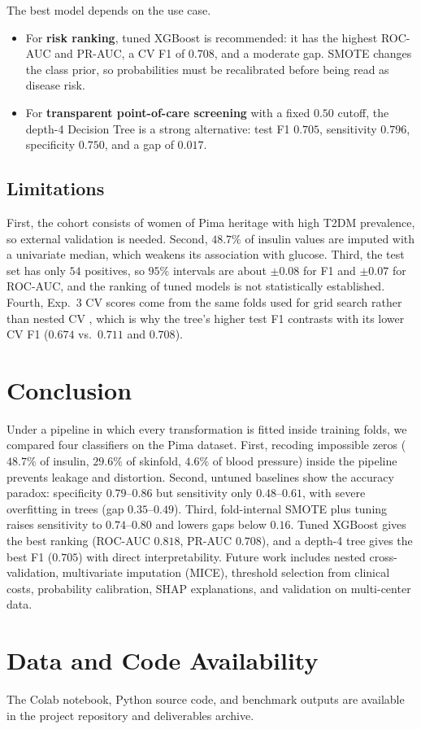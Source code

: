 \documentclass[journal]{IEEEtran}
\begin{document}
The best model depends on the use case.
\begin{itemize}
    \item For \textbf{risk ranking}, tuned XGBoost is recommended: it has the highest ROC-AUC and PR-AUC, a CV F1 of $0.708$, and a moderate gap. SMOTE changes the class prior, so probabilities must be recalibrated before being read as disease risk.
    \item For \textbf{transparent point-of-care screening} with a fixed $0.50$ cutoff, the depth-4 Decision Tree is a strong alternative: test F1 $0.705$, sensitivity $0.796$, specificity $0.750$, and a gap of $0.017$.
\end{itemize}

\subsection{Limitations}
First, the cohort consists of women of Pima heritage with high T2DM prevalence, so external validation is needed. Second, $48.7\%$ of insulin values are imputed with a univariate median, which weakens its association with glucose. Third, the test set has only $54$ positives, so $95\%$ intervals are about $\pm 0.08$ for F1 and $\pm 0.07$ for ROC-AUC, and the ranking of tuned models is not statistically established. Fourth, Exp.~3 CV scores come from the same folds used for grid search rather than nested CV \cite{cawley2010overfitting}, which is why the tree's higher test F1 contrasts with its lower CV F1 ($0.674$ vs.\ $0.711$ and $0.708$).

\section{Conclusion}\label{sec:conclusion}
Under a pipeline in which every transformation is fitted inside training folds, we compared four classifiers on the Pima dataset. First, recoding impossible zeros ($48.7\%$ of insulin, $29.6\%$ of skinfold, $4.6\%$ of blood pressure) inside the pipeline prevents leakage and distortion. Second, untuned baselines show the accuracy paradox: specificity $0.79$--$0.86$ but sensitivity only $0.48$--$0.61$, with severe overfitting in trees (gap $0.35$--$0.49$). Third, fold-internal SMOTE plus tuning raises sensitivity to $0.74$--$0.80$ and lowers gaps below $0.16$. Tuned XGBoost gives the best ranking (ROC-AUC $0.818$, PR-AUC $0.708$), and a depth-4 tree gives the best F1 ($0.705$) with direct interpretability. Future work includes nested cross-validation, multivariate imputation (MICE), threshold selection from clinical costs, probability calibration, SHAP explanations, and validation on multi-center data.

\section*{Data and Code Availability}
The Colab notebook, Python source code, and benchmark outputs are available in the project repository and deliverables archive.



\end{document}
